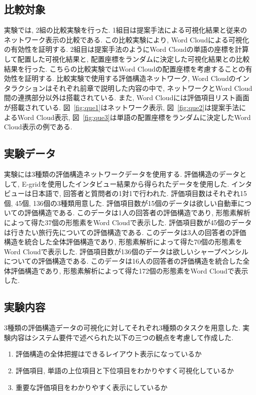 \documentclass[syuuron]{kuee}
\begin{document}
		\subsection{比較対象}
			実験では, 2組の比較実験を行った. 
			1組目は提案手法による可視化結果と従来のネットワーク表示の比較である. 
			この比較実験により, Word Cloudによる可視化の有効性を証明する. 
			2組目は提案手法のようにWord Cloudの単語の座標を計算して配置した可視化結果と, 配置座標をランダムに決定した可視化結果との比較結果を行った. 
			こちらの比較実験ではWord Cloudの配置座標を考慮することの有効性を証明する. 
			比較実験で使用する評価構造ネットワーク, Word Cloudのインタラクションはそれぞれ前章で説明した内容の中で, 
			ネットワークとWord Cloud間の連携部分以外は搭載されている. 
			また, Word Cloudには評価項目リスト画面が搭載されている. 
			図~\ref{fig:que1}はネットワーク表示, 図~\ref{fig:que2}は提案手法によるWord Cloud表示, 
			図~\ref{fig:que3}は単語の配置座標をランダムに決定したWord Cloud表示の例である. 
			
		\subsection{実験データ}
			実験には3種類の評価構造ネットワークデータを使用する. 
			評価構造のデータとして, E-gridを使用したインタビュー結果から得られたデータを使用した.
			インタビューは日本語で, 回答者と質問者の1対1で行われた. 
			評価項目数はそれぞれ15個, 45個, 136個の3種類用意した. 
			評価項目数が15個のデータは欲しい自動車についての評価構造である. 
			このデータは1人の回答者の評価構造であり, 形態素解析によって得た37個の形態素をWord Cloudで表示した. 
			評価項目数が45個のデータは行きたい旅行先についての評価構造である. 
			このデータは3人の回答者の評価構造を統合した全体評価構造であり, 形態素解析によって得た70個の形態素をWord Cloudで表示した. 
			評価項目数が136個のデータは欲しいシャープペンシルについての評価構造である. 
			このデータは16人の回答者の評価構造を統合した全体評価構造であり, 形態素解析によって得た172個の形態素をWord Cloudで表示した. 
		
		\subsection{実験内容}
			3種類の評価構造データの可視化に対してそれぞれ3種類のタスクを用意した. 
			実験内容はシステム要件で述べられた以下の三つの観点を考慮して作成した. 
			\begin{enumerate}
				\item 評価構造の全体把握はできるレイアウト表示になっているか
				\item 評価項目, 単語の上位項目と下位項目をわかりやすく可視化しているか
				\item 重要な評価項目をわかりやすく表示にしているか
			\end{enumerate}
\end{document}
